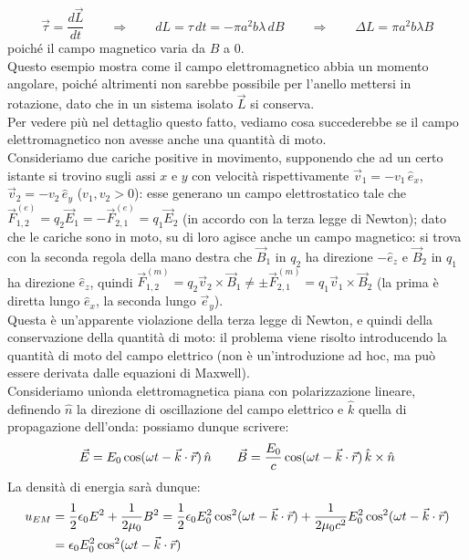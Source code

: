 \documentclass[]{article}
\begin{document}
\begin{equation}
	\vec{\tau} = \frac{d\vec{L}}{dt} \qquad\Longrightarrow\qquad dL = \tau \,dt = -\pi a^2 b \lambda \,dB \qquad\Longrightarrow\qquad \Delta L = \pi a^2 b \lambda B
	\label{eq:38}
\end{equation}
poiché il campo magnetico varia da $ B $ a $ 0 $. \\ 
%
Questo esempio mostra come il campo elettromagnetico abbia un momento angolare, poiché altrimenti non sarebbe possibile per l'anello mettersi in rotazione, dato che in un sistema isolato $ \vec{L} $ si conserva. \\ 
Per vedere più nel dettaglio questo fatto, vediamo cosa succederebbe se il campo elettromagnetico non avesse anche una quantità di moto. \\ 
Consideriamo due cariche positive in movimento, supponendo che ad un certo istante si trovino sugli assi $ x $ e $ y $ con velocità rispettivamente $ \vec{v}_1 = - v_1 \,\hat{e}_x $, $ \vec{v}_2 = - v_2 \,\hat{e}_y $ ($ v_1, v_2 > 0 $): esse generano un campo elettrostatico tale che $ \vec{F}^{(e)}_{1,2} = q_2 \vec{E}_1 = - \vec{F}^{(e)}_{2,1} = q_1 \vec{E}_2 $ (in accordo con la terza legge di Newton); dato che le cariche sono in moto, su di loro agisce anche un campo magnetico: si trova con la seconda regola della mano destra che $ \vec{B}_1 $ in $ q_2 $ ha direzione $ -\hat{e}_z $ e $ \vec{B}_2 $ in $ q_1 $ ha direzione $ \hat{e}_z $, quindi $ \vec{F}^{(m)}_{1,2} = q_2 \vec{v}_2 \times \vec{B}_1 \neq \pm \vec{F}^{(m)}_{2,1} = q_1 \vec{v}_1 \times \vec{B}_2 $ (la prima è diretta lungo $ \hat{e}_x $, la seconda lungo $ \vec{e}_y $). \\ 
%
Questa è un'apparente violazione della terza legge di Newton, e quindi della conservazione della quantità di moto: il problema viene risolto introducendo la quantità di moto del campo elettrico (non è un'introduzione ad hoc, ma può essere derivata dalle equazioni di Maxwell). \\ 
Consideriamo unìonda elettromagnetica piana con polarizzazione lineare, definendo $ \hat{n} $ la direzione di oscillazione del campo elettrico e $ \hat{k} $ quella di propagazione dell'onda: possiamo dunque scrivere:
\begin{equation}
	\vec{E} = E_0 \cos(\omega t - \vec{k}\cdot\vec{r}) \,\hat{n} \qquad \vec{B} = \frac{E_0}{c} \cos(\omega t - \vec{k}\cdot\vec{r}) \,\hat{k}\times\hat{n}
	\label{eq:39}
\end{equation}
La densità di energia sarà dunque:
\begin{equation}
	\begin{split}
		u_{EM} &= \frac{1}{2} \epsilon_0 E^2 + \frac{1}{2\mu_0} B^2 = \frac{1}{2} \epsilon_0 E_0^2 \cos^2 (\omega t - \vec{k}\cdot\vec{r}) + \frac{1}{2\mu_0 c^2} E_0^2 \cos^2 (\omega t - \vec{k}\cdot\vec{r}) \\ 
		       &= \epsilon_0 E_0^2 \cos^2 (\omega t - \vec{k}\cdot\vec{r})
	\end{split}
	\label{eq:40}
\end{equation}
\end{document}
